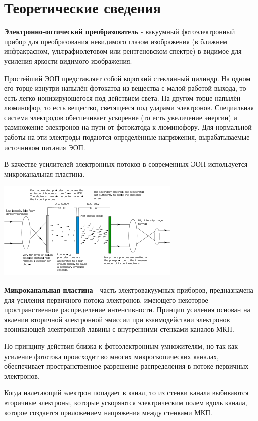 \section*{Теоретические сведения}
\textbf{Электронно-оптический преобразователь} - вакуумный фотоэлектронный прибор для преобразования невидимого глазом изображения (в ближнем инфракрасном, ультрафиолетовом или рентгеновском спектре) в видимое для усиления яркости видимого изображения. 

Простейший ЭОП представляет собой короткий стеклянный цилиндр. На одном его торце изнутри напылён фотокатод из вещества с малой работой выхода, то есть легко ионизирующегося под действием света. На другом торце напылён люминофор, то есть вещество, светящееся под ударами электронов. Специальная система электродов обеспечивает ускорение (то есть увеличение энергии) и размножение электронов на пути от фотокатода к люминофору. Для нормальной работы на эти электроды подаются определённые напряжения, вырабатываемые источником питания ЭОП.

В качестве усилителей электронных потоков в современных ЭОП используется микроканальная пластина.
\begin{center}
    \includegraphics[scale = 1]{эоп.png}
\end{center}

\indent\textbf{Микроканальная пластина} - часть электровакуумных приборов, предназначена для усиления первичного потока электронов, имеющего некоторое пространственное распределение интенсивности. Принцип усиления основан на явлении вторичной электронной эмиссии при взаимодействии электронов возникающей электронной лавины с внутренними стенками каналов МКП.

По принципу действия близка к фотоэлектронным умножителям, но так как усиление фототока происходит во многих микроскопических каналах, обеспечивает пространственное разрешение распределения в потоке первичных электронов.

Когда налетающий электрон попадает в канал, то из стенки канала выбиваются вторичные электроны, которые ускоряются электрическим полем вдоль канала, которое создается приложением напряжения между стенками МКП. 

